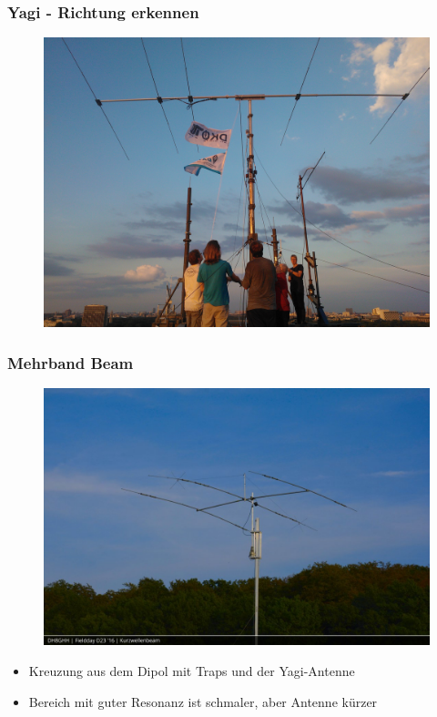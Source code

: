 \begin{frame}
  \frametitle{Yagi - Richtung erkennen}
  \begin{center}
    \begin{figure}
      \includegraphics[width=.9\textwidth,height=.75\textheight,keepaspectratio]{a09/yagi.jpg}
    \end{figure}
  \end{center}
\end{frame}

\begin{frame}
  \frametitle{Mehrband Beam}
  \begin{center}
    \begin{figure}
      \includegraphics[width=.9\textwidth,height=.6\textheight,keepaspectratio]{a09/P160924-1657050.jpg}
    \end{figure}
    \begin{itemize}
      \item Kreuzung aus dem Dipol mit Traps und der Yagi-Antenne
      \item Bereich mit guter Resonanz ist schmaler, aber Antenne kürzer
    \end{itemize}
  \end{center}
\end{frame}

